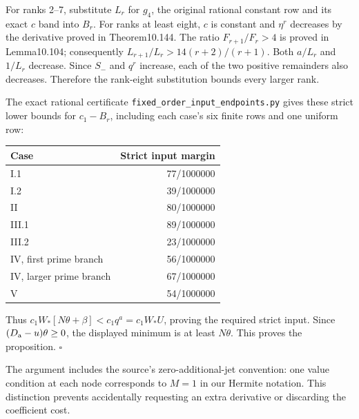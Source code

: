 \documentclass[
  11pt,
  a4paper,
]{article}
\newcounter{none} %
\begin{document}
For ranks 2--7, substitute \(L_r\) for \(g_4\), the original rational
constant row and its exact \(c\) band into \(B_r\). For ranks at least
eight, \(c\) is constant and \(\eta^r\) decreases by the derivative
proved in Theorem10.144. The ratio \(F_{r+1}/F_r>4\) is proved in
Lemma10.104; consequently \(L_{r+1}/L_r>14(r+2)/(r+1)\). Both \(a/L_r\)
and \(1/L_r\) decrease. Since \(S_-\) and \(q^r\) increase, each of the
two positive remainders also decreases. Therefore the rank-eight
substitution bounds every larger rank.

The exact rational certificate
\texttt{fixed\_order\_input\_endpoints.py} gives these strict lower
bounds for \(c_1-B_r\), including each case's six finite rows and one
uniform row:

{\def\LTcaptype{none} %
\begin{longtable}[]{@{}lr@{}}
\toprule\noalign{}
Case & Strict input margin \\
\midrule\noalign{}
\endhead
\bottomrule\noalign{}
\endlastfoot
I.1 & 77/1000000 \\
I.2 & 39/1000000 \\
II & 80/1000000 \\
III.1 & 89/1000000 \\
III.2 & 23/1000000 \\
IV, first prime branch & 56/1000000 \\
IV, larger prime branch & 67/1000000 \\
V & 54/1000000 \\
\end{longtable}
}

Thus \(c_1W_*[N\theta+\beta]<c_1q^a=c_1W_*U\), proving the required
strict input. Since \((D_{\rm a}-u)\theta\ge0\), the displayed minimum
is at least \(N\theta\). This proves the proposition. \(\square\)

The argument includes the source's zero-additional-jet convention: one
value condition at each node corresponds to \(M=1\) in our Hermite
notation. This distinction prevents accidentally requesting an extra
derivative or discarding the coefficient cost.
\end{document}
